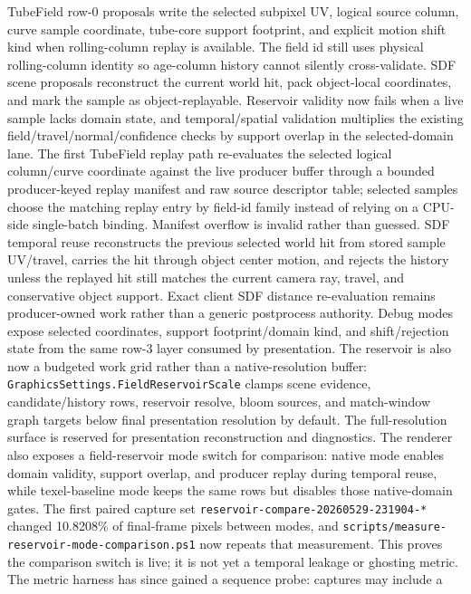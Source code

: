 \documentclass[11pt]{article}
\begin{document}
TubeField row-0 proposals write the selected subpixel UV, logical source
column, curve sample coordinate, tube-core support footprint, and explicit
motion shift kind when rolling-column replay is available.  The field id still
uses physical rolling-column identity so age-column history cannot silently
cross-validate.  SDF scene proposals reconstruct the current world hit, pack
object-local coordinates, and mark the sample as object-replayable.  Reservoir
validity now fails when a live sample lacks domain state, and temporal/spatial
validation multiplies the existing field/travel/normal/confidence checks by
support overlap in the selected-domain lane.  The first TubeField replay path
re-evaluates the selected logical column/curve coordinate against the live
producer buffer through a bounded producer-keyed replay manifest and raw source
descriptor table; selected samples choose the matching replay entry by field-id
family instead of relying on a CPU-side single-batch binding.  Manifest overflow
is invalid rather than guessed.
SDF temporal reuse reconstructs the previous selected world hit from stored
sample UV/travel, carries the hit through object center motion, and rejects the
history unless the replayed hit still matches the current camera ray, travel,
and conservative object support.  Exact client SDF distance re-evaluation
remains producer-owned work rather than a generic postprocess authority.
Debug modes expose selected coordinates, support footprint/domain kind, and
shift/rejection state from the same row-3 layer consumed by presentation.
The reservoir is also now a budgeted work grid rather than a native-resolution
buffer: \texttt{GraphicsSettings.FieldReservoirScale} clamps scene evidence,
candidate/history rows, reservoir resolve, bloom sources, and match-window graph
targets below final presentation resolution by default.  The full-resolution
surface is reserved for presentation reconstruction and diagnostics.
The renderer also exposes a field-reservoir mode switch for comparison: native
mode enables domain validity, support overlap, and producer replay during
temporal reuse, while texel-baseline mode keeps the same rows but disables those
native-domain gates.  The first paired capture set
\texttt{reservoir-compare-20260529-231904-*} changed 10.8208\% of final-frame
pixels between modes, and
\texttt{scripts/measure-reservoir-mode-comparison.ps1} now repeats that
measurement.  This proves the comparison switch is live; it is not yet a
temporal leakage or ghosting metric.
The metric harness has since gained a sequence probe: captures may include a
\end{document}
